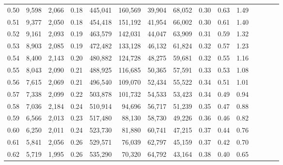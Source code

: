 \begin{tabular}{rrrcrrrrrrrrrrr}
0.50 &   9,598 &  2,066 &                                       0.18 &  445,041 &  160,569 &   39,904 &   68,052 &  0.30 &  0.63 &                         1.49 \\
0.51 &   9,377 &  2,050 &                                       0.18 &  454,418 &  151,192 &   41,954 &   66,002 &  0.30 &  0.61 &                         1.40 \\
0.52 &   9,161 &  2,093 &                                       0.19 &  463,579 &  142,031 &   44,047 &   63,909 &  0.31 &  0.59 &                         1.32 \\
0.53 &   8,903 &  2,085 &                                       0.19 &  472,482 &  133,128 &   46,132 &   61,824 &  0.32 &  0.57 &                         1.23 \\
0.54 &   8,400 &  2,143 &                                       0.20 &  480,882 &  124,728 &   48,275 &   59,681 &  0.32 &  0.55 &                         1.16 \\
0.55 &   8,043 &  2,090 &                                       0.21 &  488,925 &  116,685 &   50,365 &   57,591 &  0.33 &  0.53 &                         1.08 \\
0.56 &   7,615 &  2,069 &                                       0.21 &  496,540 &  109,070 &   52,434 &   55,522 &  0.34 &  0.51 &                         1.01 \\
0.57 &   7,338 &  2,099 &                                       0.22 &  503,878 &  101,732 &   54,533 &   53,423 &  0.34 &  0.49 &                         0.94 \\
0.58 &   7,036 &  2,184 &                                       0.24 &  510,914 &   94,696 &   56,717 &   51,239 &  0.35 &  0.47 &                         0.88 \\
0.59 &   6,566 &  2,013 &                                       0.23 &  517,480 &   88,130 &   58,730 &   49,226 &  0.36 &  0.46 &                         0.82 \\
0.60 &   6,250 &  2,011 &                                       0.24 &  523,730 &   81,880 &   60,741 &   47,215 &  0.37 &  0.44 &                         0.76 \\
0.61 &   5,841 &  2,056 &                                       0.26 &  529,571 &   76,039 &   62,797 &   45,159 &  0.37 &  0.42 &                         0.70 \\
0.62 &   5,719 &  1,995 &                                       0.26 &  535,290 &   70,320 &   64,792 &   43,164 &  0.38 &  0.40 &                         0.65 \\

\end{tabular}
